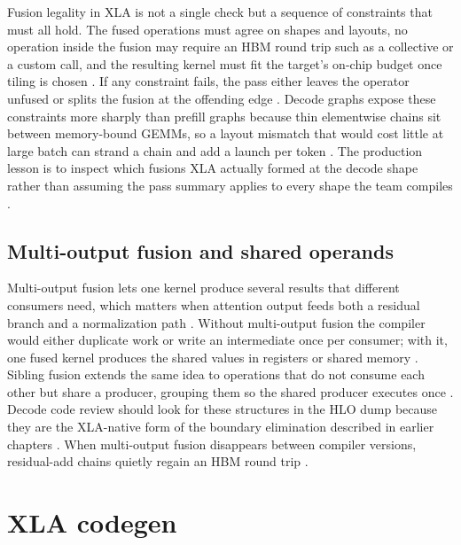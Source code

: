 Fusion legality in XLA is not a single check but a sequence of constraints that must all hold. The fused operations must agree on shapes and layouts, no operation inside the fusion may require an HBM round trip such as a collective or a custom call, and the resulting kernel must fit the target's on-chip budget once tiling is chosen \citep{openxla2024,chen2020compilerbasedhardw}. If any constraint fails, the pass either leaves the operator unfused or splits the fusion at the offending edge \citep{openxla2024,memoryfloor2026}. Decode graphs expose these constraints more sharply than prefill graphs because thin elementwise chains sit between memory-bound GEMMs, so a layout mismatch that would cost little at large batch can strand a chain and add a launch per token \citep{taxbreak2026,patel2025llminference}. The production lesson is to inspect which fusions XLA actually formed at the decode shape rather than assuming the pass summary applies to every shape the team compiles \citep{patel2025llminference,memoryfloor2026}.

\subsection{Multi-output fusion and shared operands}

Multi-output fusion lets one kernel produce several results that different consumers need, which matters when attention output feeds both a residual branch and a normalization path \citep{openxla2024,taxbreak2026}. Without multi-output fusion the compiler would either duplicate work or write an intermediate once per consumer; with it, one fused kernel produces the shared values in registers or shared memory \citep{openxla2024,memoryfloor2026}. Sibling fusion extends the same idea to operations that do not consume each other but share a producer, grouping them so the shared producer executes once \citep{openxla2024,chen2020compilerbasedhardw}. Decode code review should look for these structures in the HLO dump because they are the XLA-native form of the boundary elimination described in earlier chapters \citep{dao2022flashattention,yirage2026}. When multi-output fusion disappears between compiler versions, residual-add chains quietly regain an HBM round trip \citep{memoryfloor2026,patel2025llminference}.

\section{XLA codegen}
\label{sec:ch15_xla_codegen}

